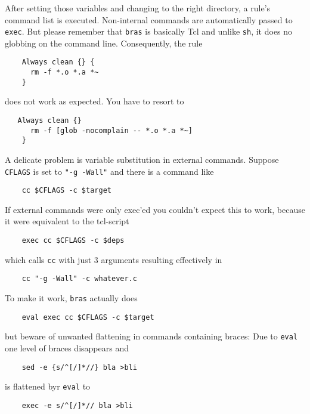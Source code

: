 \documentclass[12pt]{article}
\newcommand{\bras}{\texttt{bras}}
\begin{document}
{After setting those variables and changing to the right directory, a
rule's command list is executed. Non-internal commands are
automatically passed to \texttt{exec}. But please remember that
\bras{} is basically Tcl and unlike \texttt{sh}, it does no globbing
on the command line. Consequently, the rule
\begin{verbatim}
    Always clean {} {
      rm -f *.o *.a *~
    }
\end{verbatim}
does not work as expected. You have to resort to
\begin{verbatim}
   Always clean {}
      rm -f [glob -nocomplain -- *.o *.a *~]
    }
\end{verbatim}
    
A delicate problem is variable substitution in
external commands. Suppose \texttt{CFLAGS} is set to 
\texttt{"-g -Wall"} and there is a command like 

\begin{verbatim}
    cc $CFLAGS -c $target
\end{verbatim}

If external commands were only exec'ed you couldn't expect this to
work, because it were equivalent to the tcl-script

\begin{verbatim}
    exec cc $CFLAGS -c $deps
\end{verbatim}

which calls \texttt{cc} with just 3 arguments resulting effectively in

\begin{verbatim}
    cc "-g -Wall" -c whatever.c
\end{verbatim}

To make it work, \bras{} actually does

\begin{verbatim}
    eval exec cc $CFLAGS -c $target
\end{verbatim}

but beware of unwanted flattening in commands containing braces: Due
to \texttt{eval} one level of braces
disappears and

\begin{verbatim}
    sed -e {s/^[/]*//} bla >bli
\end{verbatim}

is flattened byr \texttt{eval} to

\begin{verbatim}
    exec -e s/^[/]*// bla >bli
\end{verbatim}

}
\end{document}
